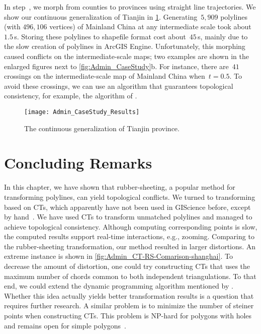 In step~, we morph from counties to provinces 
using straight line trajectories. 
We show our continuous generalization of Tianjin in 
\fig\ref{fig:Admin_CaseStudy_Tianjin}.
Generating~$5{,}909$ polylines (with $496{,}106$ vertices) of 
Mainland China at any intermediate scale took about~$1.5\,$s.
Storing these polylines to shapefile format cost about~$45\,$s,
mainly due to the slow creation of polylines in ArcGIS Engine.
Unfortunately, this morphing caused conflicts on the 
intermediate-scale maps; 
two examples are shown in the enlarged figures next to
\fig\ref{fig:Admin_CaseStudy}b. 
For instance, there are~$41$ crossings on the 
intermediate-scale map of Mainland China when~$t=0.5$. 
To avoid these crossings, we can use an algorithm 
that guarantees topological consistency, 
for example, the algorithm of \textcite{GotsmanS2001}.

\begin{figure}[tb]
\centering
\texttt{[image: Admin\_CaseStudy\_Results]}
\caption{The continuous generalization of Tianjin province.}
\label{fig:Admin_CaseStudy_Tianjin}
\end{figure}


\section{Concluding Remarks}
\label{sec:Admin_Conclusions}

In this chapter, we have shown that rubber-sheeting, 
a popular method for transforming polylines, 
can yield topological conflicts.
We turned to transforming based on CTs,
which apparently have not been used 
in GIScience before, except by hand~\parencite[e.g.,][]{Fuse2004}.
We have used CTs to 
transform unmatched polylines and 
managed to achieve topological consistency. 
Although computing corresponding points is slow, 
the computed results support 
real-time interactions, e.g., zooming.
Comparing to the rubber-sheeting transformation, 
our method resulted in larger distortions.  
An extreme instance is shown in
\fig\ref{fig:Admin_CT-RS-Comarison-shanghai}.
To decrease the amount of distortion, 
one could try constructing CTs 
that uses the maximum number of chords common to 
both independent triangulations.
To that end, we could extend the dynamic programming algorithm
mentioned by \textcite{Diwan2011Triangulations}.
Whether this idea actually yields better transformation results 
is a question that requires further research.
A similar problem is to minimize the number of steiner points 
when constructing CTs.
This problem is NP-hard for polygons with holes and 
remains open for simple polygons~\parencite{Lubiw2017CT}.

